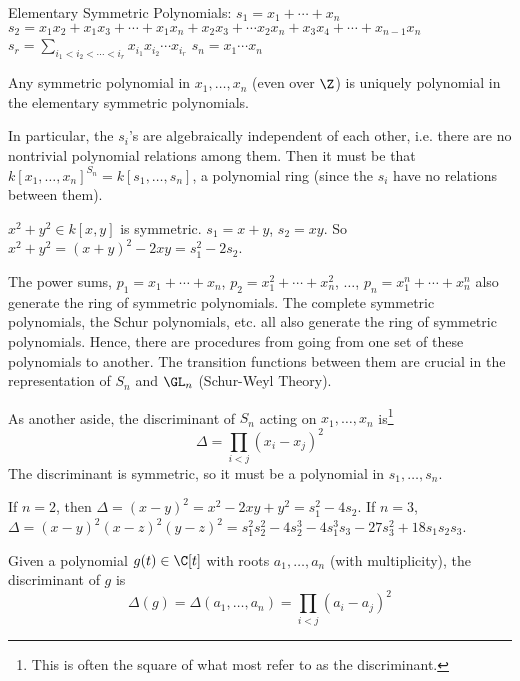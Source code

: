 Elementary Symmetric Polynomials:
$s_1= x_1 + \cdots + x_n$
$s_2= x_1x_2+ x_1x_3+ \cdots + x_1x_n+x_2x_3+\cdots x_2x_n+x_3x_4+\cdots+x_{n-1}x_n$
$s_r= \sum_{i_1<i_2<\cdots<i_r} x_{i_1} x_{i_2} \cdots x_{i_r}$
$s_n= x_1\cdots x_n$


\begin{thm}
Any symmetric polynomial in $x_1,\ldots,x_n$ (even over $\Z$) is uniquely polynomial in the elementary symmetric polynomials. 
\end{thm}

In particular, the $s_i$'s are algebraically independent of each other, i.e. there are no nontrivial polynomial relations among them. Then it must be that $k[x_1,\ldots,x_n]^{S_n}= k[s_1,\ldots,s_n]$, a polynomial ring (since the $s_i$ have no relations between them). 


\begin{ex}
$x^2+y^2 \in k[x,y]$ is symmetric. $s_1= x+y$, $s_2= xy$. So $x^2+y^2=(x+y)^2-2xy= s_1^2-2s_2$. 
\end{ex}


\begin{rem}
The power sums, $p_1=x_1+\cdots+x_n$, $p_2=x_1^2+\cdots+x_n^2$, $\ldots$, $p_n=x_1^n+\cdots+x_n^n$ also generate the ring of symmetric polynomials. The complete symmetric polynomials, the Schur polynomials, etc. all also generate the ring of symmetric polynomials. Hence, there are procedures from going from one set of these polynomials to another. The transition functions between them are crucial in the representation of $S_n$ and $\GL_n$ (Schur-Weyl Theory). 
\end{rem}


As another aside, the discriminant of $S_n$ acting on $x_1,\ldots,x_n$ is\footnote{This is often the square of what most refer to as the discriminant.}
	\[
	\Delta= \prod_{i<j} (x_i - x_j)^2
	\]
The discriminant is symmetric, so it must be a polynomial in $s_1,\ldots,s_n$. 

\begin{ex}
If $n=2$, then $\Delta=(x-y)^2=x^2-2xy+y^2= s_1^2- 4s_2$. If $n=3$, $\Delta=(x - y)^2(x-z)^2(y-z)^2= s_1^2s_2^2- 4s_2^3 - 4s_1^3s_3 - 27 s_3^2+ 18s_1s_2s_3$. 
\end{ex}

Given a polynomial $g(t) \in \C[t]$ with roots $a_1,\ldots,a_n$ (with multiplicity), the discriminant of $g$ is
	\[
	\Delta(g)= \Delta(a_1,\ldots,a_n)= \prod_{i<j} (a_i-a_j)^2
	\]

